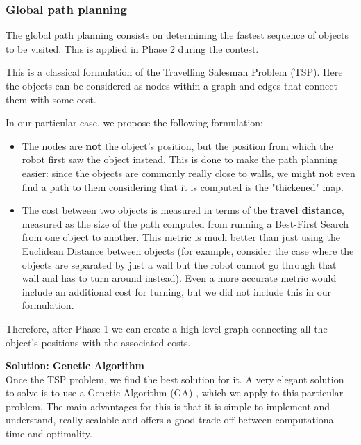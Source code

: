 \subsubsection{Global path planning}
The global path planning consists on determining the fastest sequence of objects to be visited. This is applied in Phase 2 during the contest. 

This is a classical formulation of the Travelling Salesman Problem (TSP). Here the objects can be considered as nodes within a graph and edges that connect them with some cost.

In our particular case, we propose the following formulation:
\begin{itemize}
\item The nodes are \textbf{not} the object's position, but the position from which the robot first saw the object instead. This is done to make the path planning easier: since the objects are commonly really close to walls, we might not even find a path to them considering that it is computed is the "thickened" map. 
\item The cost between two objects is measured in terms of the \textbf{travel distance}, measured as the size of the path computed from running a Best-First Search from one object to another. This metric is much better than just using the Euclidean Distance between objects (for example, consider the case where the objects are separated by just a wall but the robot cannot go through that wall and has to turn around instead). Even a more accurate metric would include an additional cost for turning, but we did not include this in our formulation.
\end{itemize}

Therefore, after Phase 1 we can create a high-level graph connecting all the object's positions with the associated costs. 

\textbf{Solution: Genetic Algorithm}\\
Once the TSP problem, we find the best solution for it. A very elegant solution to solve is to use a Genetic Algorithm (GA) \cite{genetic}, which we apply to this particular problem. The main advantages for this is that it is simple to implement and understand, really scalable and offers a good trade-off between computational time and optimality. 


